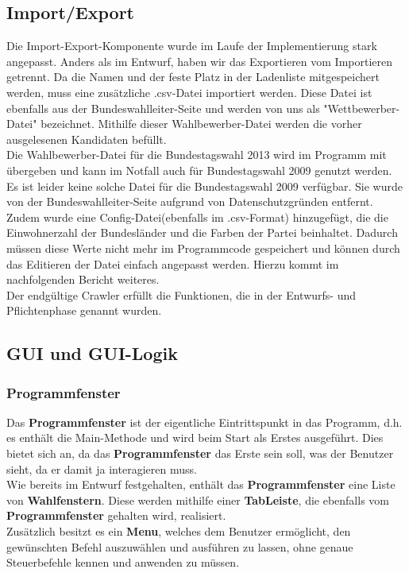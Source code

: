 \documentclass[12pt,a4paper,titlepage]{article}
\newcommand{\myma}{\fontfamily{pcr}\selectfont \textbf}
\begin{document}
\subsection{Import/Export}	
Die Import-Export-Komponente wurde im Laufe der Implementierung stark angepasst. Anders als im Entwurf, haben wir das Exportieren vom Importieren getrennt. Da die Namen und der feste Platz in der Ladenliste mitgespeichert werden, muss eine zusätzliche .csv-Datei importiert werden. Diese Datei ist ebenfalls aus der Bundeswahlleiter-Seite und werden von uns als "Wettbewerber-Datei" bezeichnet. Mithilfe dieser Wahlbewerber-Datei werden die vorher ausgelesenen Kandidaten befüllt. \\
Die Wahlbewerber-Datei für die Bundestagswahl 2013 wird im Programm mit übergeben und kann im Notfall auch für Bundestagswahl 2009 genutzt werden. Es ist leider keine solche Datei für die Bundestagswahl 2009 verfügbar. Sie wurde von der Bundeswahlleiter-Seite aufgrund von Datenschutzgründen entfernt. \\
Zudem wurde eine Config-Datei(ebenfalls im .csv-Format) hinzugefügt, die die Einwohnerzahl der Bundesländer und die Farben der Partei beinhaltet. Dadurch müssen diese Werte nicht mehr im Programmcode gespeichert und können durch das Editieren der Datei einfach angepasst werden. Hierzu kommt im nachfolgenden Bericht weiteres.\\
Der endgültige Crawler erfüllt die Funktionen, die in der Entwurfs- und Pflichtenphase genannt wurden.

\subsection{GUI und GUI-Logik}

\subsubsection{Programmfenster}
Das {\myma{Programmfenster}} ist der eigentliche Eintrittspunkt in das Programm, d.h. es enthält die Main-Methode und wird beim Start als Erstes ausgeführt. Dies bietet sich an, da das {\myma{Programmfenster}} das Erste sein soll, was der Benutzer sieht, da er damit ja interagieren muss. \\
Wie bereits im Entwurf festgehalten, enthält das {\myma{Programmfenster}} eine Liste von {\myma{Wahlfenstern}}. Diese werden mithilfe einer {\myma{TabLeiste}}, die ebenfalls vom {\myma{Programmfenster}} gehalten wird, realisiert. \\
Zusätzlich besitzt es ein {\myma{Menu}}, welches dem Benutzer ermöglicht, den gewünschten Befehl auszuwählen und ausführen zu lassen, ohne genaue Steuerbefehle kennen und anwenden zu müssen. \\
\end{document}
